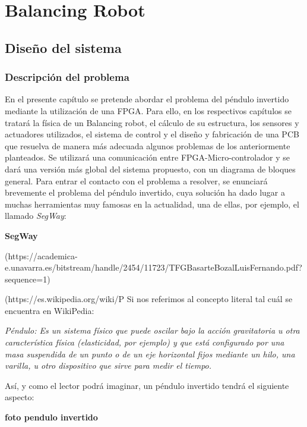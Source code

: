 \chapter{Balancing Robot}\label{sec: BalancingRobot}
\section{Diseño del sistema}
\subsection{Descripción del problema}
En el presente capítulo se pretende abordar el problema del péndulo invertido mediante la utilización de una FPGA. Para ello, en los respectivos capítulos se tratará la física de un Balancing robot, el cálculo de su estructura, los sensores y actuadores utilizados, el sistema de control y el diseño y fabricación de una PCB que resuelva de manera más adecuada algunos problemas de los anteriormente planteados. Se utilizará una comunicación entre FPGA-Micro-controlador y se dará una versión más global del sistema propuesto, con un diagrama de bloques general. \newline
\newline Para entrar el contacto con el problema a resolver, se enunciará brevemente el problema del péndulo invertido, cuya solución ha dado lugar a muchas herramientas muy famosas en la actualidad, una de ellas, por ejemplo, el llamado \textit{SegWay}:

\textbf{SegWay}

(https://academica-e.unavarra.es/bitstream/handle/2454/11723/TFGBasarteBozalLuisFernando.pdf?sequence=1)

(https://es.wikipedia.org/wiki/P%
Si nos referimos al concepto literal tal cuál se encuentra en WikiPedia: \newline

\newline\textsl{Péndulo: Es un sistema físico que puede oscilar bajo la acción gravitatoria u otra característica física (elasticidad, por ejemplo) y que está configurado por una masa suspendida de un punto o de un eje horizontal fijos mediante un hilo, una varilla, u otro dispositivo que sirve para medir el tiempo.}\newline

Así, y como el lector podrá imaginar, un péndulo invertido tendrá el siguiente aspecto: 

\textbf{foto pendulo invertido}

